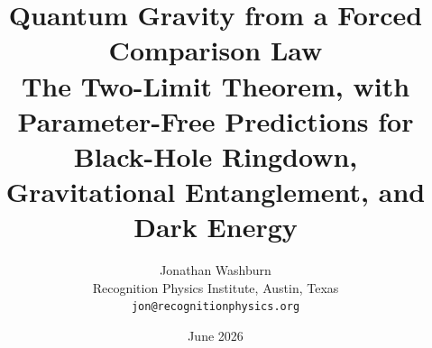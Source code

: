 \documentclass[11pt,letterpaper]{article}
\theoremstyle{definition}
\begin{document}
\title{\textbf{Quantum Gravity from a Forced Comparison Law}\\[6pt]
{\large The Two-Limit Theorem, with Parameter-Free Predictions for\\
Black-Hole Ringdown, Gravitational Entanglement, and Dark Energy}}

\author{Jonathan Washburn\\
\small Recognition Physics Institute, Austin, Texas\\
\small \texttt{jon@recognitionphysics.org}}

\date{June 2026}

\maketitle

\end{document}

